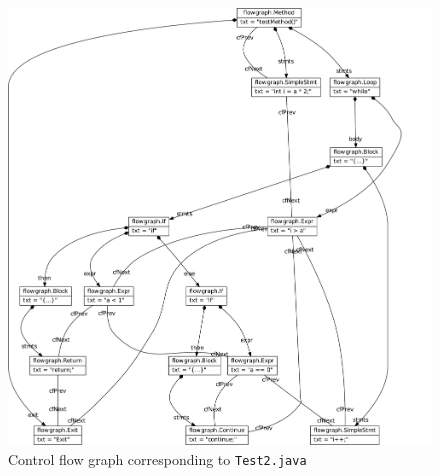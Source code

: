 \documentclass[11pt]{article}
\begin{document}
\begin{figure}[h!]
  \centering
  \includegraphics[width=\linewidth]{../results/Test2-ControlFlowGraph}
  \caption{Control flow graph corresponding to \texttt{Test2.java}}
  \label{fig:cfg-test2}
\end{figure}
\end{document}
